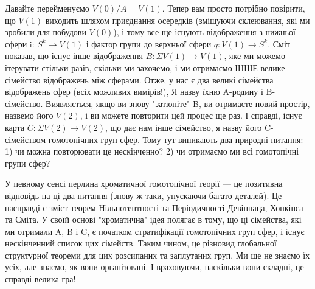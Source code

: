 Давайте перейменуємо $V(0)/A = V(1)$. Тепер вам просто потрібно повірити,
що $V(1)$ виходить шляхом приєднання осередків (змішуючи склеювання, які ми
зробили для побудови $V(0)$), і тому все ще існують відображення з нижньої
сфери i: $S^k \rightarrow V(1)$ і фактор групи до верхньої сфери $q: V(1) \rightarrow S^k$.
Сміт показав, що існує інше відображення $B: \Sigma V(1) \rightarrow V(1)$,
яке ми можемо ітерувати стільки разів, скільки ми захочемо, і ми отримаємо
ІНШЕ велике сімейство відображень між сферами. Отже, у нас є два великі
сімейства відображень сфер (всіх можливих вимірів!), Я назву їхню A-родину
і B-сімейство. Виявляється, якщо ви знову "затюніте" B, ви отримаєте новий
простір, назвемо його $V(2)$, і ви можете повторити цей процес ще раз.
І справді, існує карта $C: \Sigma V(2) \rightarrow V(2)$, що дає нам інше
сімейство, я назву його C-сімейством гомотопічних груп сфер. Тому тут
виникають два природні питання: 1) чи можна повторювати це нескінченно?
2) чи отримаємо ми всі гомотопічні групи сфер?

У певному сенсі перлина хроматичної гомотопічної теорії --- це позитивна
відповідь на ці два питання (знову ж таки, упускаючи багато деталей).
Це насправді є зміст теорем Нільпотентності та Періодичності Девіннаца,
Хопкінса та Сміта. У своїй основі "хроматична" ідея полягає в тому, що
ці сімейства, які ми отримали A, B і C, є початком стратифікації
гомотопічних груп сфер, і існує нескінченний список цих сімейств.
Таким чином, це різновид глобальної структурної теореми для цих розсипаних
та заплутаних груп. Ми ще не знаємо їх усіх, але знаємо, як вони
організовані. І враховуючи, наскільки вони складні, це справді велика гра!

